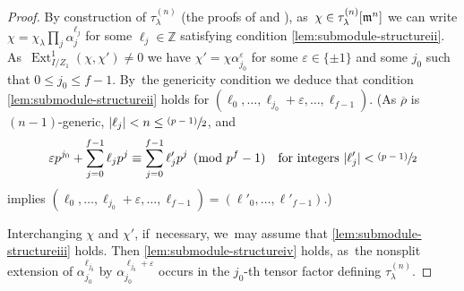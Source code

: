 \documentclass[JEP,XML,SOM,Unicode,NoFloatCountersInSection, NoEqCountersInSection,published]{cedram}
\newcommand{\psfrac}[2]{\sfrac{(#1)}{#2}}
\newcommand{\Z}{{\mathbb Z}}
\newcommand{\brho}{\overline{\rho}}
\DeclareMathOperator{\Ext}{Ext}
\let\ve\varepsilon
\theoremstyle{plain}
\theoremstyle{definition}
\begin{document}
\begin{proof}
By construction of $\tau^{(n)}_\lambda$ (\cf the proofs of \cite[Lem.\,2.4.1]{BHHMS4} and \cite[Prop.\,9.19]{HuWang2}), as~$\chi\in \tau^{(n)}_\lambda[\mathfrak{m}^n]$ we can write $\chi = \chi_\lambda \prod_j \alpha_j^{\ell_j}$ for some $\ell_j \in \Z$ satisfying condition \eqref{lem:submodule-structureii}. As~$\Ext^1_{I/Z_1}(\chi,\chi') \ne 0$ we have $\chi' = \chi \alpha_{j_0}^{\ve}$ for some $\ve \in \{\pm1\}$ and some $j_0$ such that $0 \le j_0 \le f-1$. By~the genericity condition we deduce that condition \eqref{lem:submodule-structureii} holds for $(\ell_0,\dots,\ell_{j_0}+\ve,\dots,\ell_{f-1})$.
(As $\brho$ is {$(n-1)$}-generic, $|\ell_j| < n \le \psfrac{p-1}2$, and
\[
\ve p^{j_0}+\sum_{j=0}^{f-1} \ell_jp^j \equiv \sum_{j=0}^{f-1} \ell'_jp^j \pmod{p^f-1}\quad\text{for integers }|\ell'_j| < \psfrac{p-1}2
\]
implies $(\ell_0,\dots,\ell_{j_0}+\ve,\dots,\ell_{f-1})=(\ell'_0,\dots,\ell'_{f-1})$.)

Interchanging $\chi$ and $\chi'$, if~necessary, we~may assume that \eqref{lem:submodule-structureiii} holds.
Then \eqref{lem:submodule-structureiv} holds, as~the nonsplit extension of $\alpha_{j_0}^{\ell_{j_0}}$ by $\alpha_{j_0}^{\ell_{j_0}+\ve}$ occurs in the $j_0$-th tensor factor defining $\tau^{(n)}_\lambda$.
\end{proof}
\end{document}
